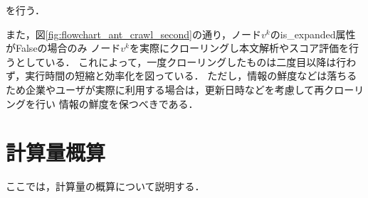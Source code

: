 を行う．

また，図\ref{fig:flowchart_ant_crawl_second}の通り，ノード\(v^k\)のis\_expanded属性がFalseの場合のみ
ノード\(v^k\)を実際にクローリングし本文解析やスコア評価を行うとしている．
これによって，一度クローリングしたものは二度目以降は行わず，実行時間の短縮と効率化を図っている．
ただし，情報の鮮度などは落ちるため企業やユーザが実際に利用する場合は，更新日時などを考慮して再クローリングを行い
情報の鮮度を保つべきである．

\section{計算量概算}

ここでは，計算量の概算について説明する．


